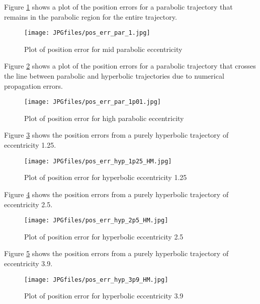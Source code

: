 \begin{description}
Figure \ref{par_mid_pos} shows a plot of the position errors for a parabolic
trajectory that remains in the parabolic region for the entire trajectory.

\begin{figure}[h]
\begin{center}
\texttt{[image: JPGfiles/pos\_err\_par\_1.jpg]}
\caption{Plot of position error for mid parabolic eccentricity}
\label{par_mid_pos}
\end{center}
\end{figure}

Figure \ref{par_high_pos} shows a plot of the position errors for a parabolic
trajectory that crosses the line between parabolic and hyperbolic trajectories
due to numerical propagation errors.

\begin{figure}[h]
\begin{center}
\texttt{[image: JPGfiles/pos\_err\_par\_1p01.jpg]}
\caption{Plot of position error for high parabolic eccentricity}
\label{par_high_pos}
\end{center}
\end{figure}

Figure \ref{hyp_low_HM} shows the position errors from a purely hyperbolic
trajectory of eccentricity 1.25.

\begin{figure}[h]
\begin{center}
\texttt{[image: JPGfiles/pos\_err\_hyp\_1p25\_HM.jpg]}
\caption{Plot of position error for hyperbolic eccentricity 1.25}
\label{hyp_low_HM}
\end{center}
\end{figure}

Figure \ref{hyp_mid_HM} shows the position errors from a purely hyperbolic
trajectory of eccentricity 2.5.

\begin{figure}[h]
\begin{center}
\texttt{[image: JPGfiles/pos\_err\_hyp\_2p5\_HM.jpg]}
\caption{Plot of position error for hyperbolic eccentricity 2.5}
\label{hyp_mid_HM}
\end{center}
\end{figure}

Figure \ref{hyp_high_HM} shows the position errors from a purely hyperbolic
trajectory of eccentricity 3.9.

\begin{figure}[h]
\begin{center}
\texttt{[image: JPGfiles/pos\_err\_hyp\_3p9\_HM.jpg]}
\caption{Plot of position error for hyperbolic eccentricity 3.9}
\label{hyp_high_HM}
\end{center}
\end{figure}


\end{description}

